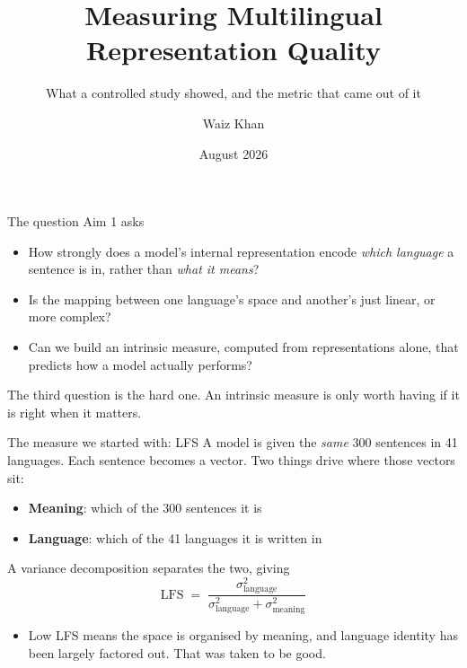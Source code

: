 \documentclass[aspectratio=169,11pt]{beamer}
\title{\textbf{Measuring Multilingual Representation Quality}}
\subtitle{What a controlled study showed, and the metric that came out
of it}
\author{Waiz Khan}
\institute{\small Johns Hopkins University \quad wkhan12@jh.edu}
\date{\small August 2026}
\newcommand{\Hi}[1]{{\color{acc}\textbf{#1}}}
\begin{document}
{
\begin{frame}\titlepage\end{frame}}

\begin{frame}{The question Aim 1 asks}
\large
\begin{itemize}\setlength\itemsep{10pt}
\item How strongly does a model's internal representation encode
\emph{which language} a sentence is in, rather than \emph{what it
means}?
\item Is the mapping between one language's space and another's just
linear, or more complex?
\item Can we build an intrinsic measure, computed from representations
alone, that predicts how a model actually performs?
\end{itemize}
\vspace{10pt}
{\color{mut}The third question is the hard one. An intrinsic measure is
only worth having if it is right when it matters.}
\end{frame}

\begin{frame}{The measure we started with: LFS}
A model is given the \emph{same} 300 sentences in 41 languages. Each
sentence becomes a vector. Two things drive where those vectors sit:
\vspace{6pt}
\begin{itemize}
\item \Hi{Meaning}: which of the 300 sentences it is
\item \Hi{Language}: which of the 41 languages it is written in
\end{itemize}
\vspace{8pt}
A variance decomposition separates the two, giving
\[
\text{LFS} \;=\; \frac{\sigma^2_{\text{language}}}
{\sigma^2_{\text{language}} + \sigma^2_{\text{meaning}}}
\]
\vspace{-4pt}
\begin{itemize}
\item Low LFS means the space is organised by meaning, and language
identity has been largely factored out. That was taken to be good.
\end{itemize}
\end{frame}
\end{document}
